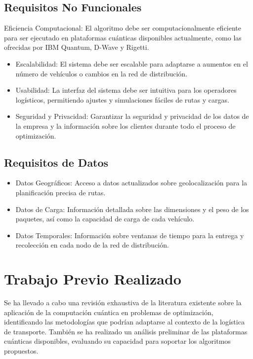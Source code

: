 \subsection{Requisitos No Funcionales}
Eficiencia Computacional: El algoritmo debe ser computacionalmente eficiente para ser ejecutado en plataformas cuánticas disponibles actualmente, como las ofrecidas por IBM Quantum, D-Wave y Rigetti.

\begin{itemize}
\item Escalabilidad: El sistema debe ser escalable para adaptarse a aumentos en el número de vehículos o cambios en la red de distribución.

\item Usabilidad: La interfaz del sistema debe ser intuitiva para los operadores logísticos, permitiendo ajustes y simulaciones fáciles de rutas y cargas.

\item Seguridad y Privacidad: Garantizar la seguridad y privacidad de los datos de la empresa y la información sobre los clientes durante todo el proceso de optimización.
\end{itemize}

\subsection{Requisitos de Datos}
\begin{itemize}
\item Datos Geográficos: Acceso a datos actualizados sobre geolocalización para la planificación precisa de rutas.

\item Datos de Carga: Información detallada sobre las dimensiones y el peso de los paquetes, así como la capacidad de carga de cada vehículo.

\item Datos Temporales: Información sobre ventanas de tiempo para la entrega y recolección en cada nodo de la red de distribución.

\end{itemize}

\section{Trabajo Previo Realizado}

Se ha llevado a cabo una revisión exhaustiva de la literatura existente sobre la aplicación de la computación cuántica en problemas de optimización, identificando las metodologías que podrían adaptarse al contexto de la logística de transporte. También se ha realizado un análisis preliminar de las plataformas cuánticas disponibles, evaluando su capacidad para soportar los algoritmos propuestos.
